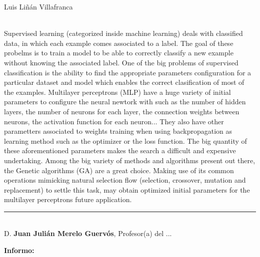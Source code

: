 \begin{center}

    Luis Liñán Villafranca\\

\end{center}

\vspace{0.5cm}
\vspace{0.7cm}

\\

Supervised learning (categorized inside machine learning) deals with classified
data, in which each example comes associated to a label. The goal of these
probelms is to train a model to be able to correctly classify a new example
without knowing the associated label. One of the big problems of supervised
classification is the ability to find the appropriate parameters configuration
for a particular dataset and model which enables the correct clasification of
most of the examples. Multilayer perceptrons (MLP) have a huge variety of
initial parameters to configure the neural newtork with such as the number of
hidden layers, the number of neurons for each layer, the connection weights
between neurons, the activation function for each neuron... They also have
other parametters associated to weights training when using backpropagation as
learning method such as the optimizer or the loss function. The big quantity of
these aforementioned parameters makes the search a difficult and expensive
undertaking. Among the big variety of methods and algorithms present out there,
the Genetic algorithms (GA) are a great choice. Making use of its common
operations mimicking natural selection flow (selection, crossover, mutation and
replacement) to settle this task, may obtain optimized initial parameters for
the multilayer perceptrons future application.


\cleardoublepage

\thispagestyle{empty}

\noindent\rule[-1ex]{\textwidth}{2pt}\\[4.5ex]

D. \textbf{Juan Julián Merelo Guervós}, Profesor(a) del ...

\vspace{0.5cm}

\textbf{Informo:}


